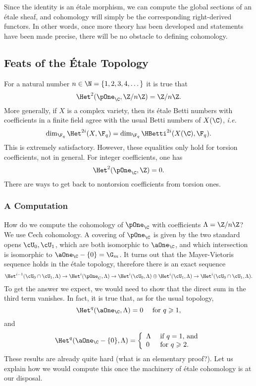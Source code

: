 Since the identity is an \'etale morphism, we can compute the global sections of an \'etale sheaf, and cohomology will simply be the corresponding right-derived functors. In other words, once more theory has been developed and statements have been made precise, there will be no obstacle to defining cohomology.

\subsection{Feats of the \'Etale Topology}

For a natural number $n \in \N = \{1, 2, 3, 4, \dots\}$ it is true that
$$
\Het^2 (\pOne_\C, \Z/n\Z) = \Z/n\Z.
$$
More generally, if $X$ is a complex variety, then its \'etale Betti numbers with coefficients in a finite field agree with the usual Betti numbers of $X(\C)$, {\it i.e.}
$$
\dim_{\F_q} \Het^{2i} (X, \F_q) = \dim_{\F_q} \HBetti^{2i} (X(\C), \F_q).
$$ 
This is extremely satisfactory. However, these equalities only hold for torsion coefficients, not in general. For integer coefficients, one has
$$
\Het^2 (\pOne_\C, \Z) = 0.
$$
There are ways to get back to nontorsion coefficients from torsion ones.

\subsubsection{A Computation}

How do we compute the cohomology of $\pOne_\C$ with coefficients $\Lambda = \Z/n\Z$? 
We use \u Cech cohomology. A covering of $\pOne_\C$ is given by the two standard opens $\cU_0, \cU_1$, which are both isomorphic to $\aOne_\C$, and  which intersection is isomorphic to $\aOne_\C -  \{0\} = \G_m$. It turns out that the Mayer-Vietoris sequence holds in the \'etale topology, therefore there is an exact sequence
$$
\Het^{i-1}(\cU_0\cap \cU_1, \Lambda) \to \Het^i(\pOne_C, \Lambda) \to \Het^i(\cU_0, \Lambda) \oplus \Het^i(\cU_1, \Lambda) \to \Het^i(\cU_0\cap \cU_1, \Lambda).
$$
To get the answer we expect, we would need to show that the direct sum in the third term vanishes. In fact, it is true that, as for the usual topology,
$$
\Het^q (\aOne_\C, \Lambda) = 0 \quad \text{ for } q \geqslant 1,
$$ 
and
$$
\Het^q (\aOne_\C-\{0\}, \Lambda) = \left\{
\begin{array}{ll}
\Lambda & \text{ if $q = 1$, and} \\
0 & \text{ for $q \geqslant 2$.}
\end{array}
\right. 
$$
These results are already quite hard (what is an elementary proof?). Let us explain how we would compute this once the machinery of \'etale cohomology is at our disposal.


